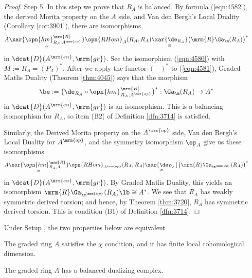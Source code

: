 \begin{proof}
\medskip \noindent Step 5.  
In this step we prove that $R_A$ is balanced. 
By formula (\ref{eqn:4582}), the derived Morita property on the $A$ side, and 
Van den Bergh's Local Duality (Corollary \ref{cor:3901}), there are isomorphisms
\begin{equation} \label{eqn:4581}
A \underset{\cong}{\xar{\opn{hm}^{\mrm{R}}_{R_A, A^{\mrm{op}}}}} 
\opn{RHom}_{A}(R_A, R_A) \underset{\cong}{\xar{\de_{R_A}}}
\bigl( \mrm{R} \Ga_{\m}(R_A) \bigr)^* 
\end{equation}
in $\dcat{D}(A^{\mrm{en}}, \mrm{gr})$.
See the isomorphism (\ref{eqn:4580}) with $M := R_A = (P_A)^*$.
After we apply the functor $(-)^*$ to (\ref{eqn:4581}), Graded Matlis Duality 
(Theorem \ref{thm:4045}) says that the morphism 
\[ \be := 
\bigl( \de_{R_A} \circ \opn{hm}^{\mrm{R}}_{R_A, A^{\mrm{op}}} \bigr)^* : 
\Ga_{\m}(R_A) \to A^* \]
in $\dcat{D}(A^{\mrm{en}}, \mrm{gr})$ is an isomorphism. This is a 
balancing isomorphism for $R_A$, so item (B2) of Definition 
\ref{dfn:3714} is satisfied.

Similarly, the Derived Morita property on the $A^{\mrm{op}}$ side, 
Van den Bergh's Local Duality for $A^{\mrm{op}}$, and the symmetry isomorphism 
$\ep_A$ give us these isomorphisms 
\[ A \underset{\cong}{\xar{\opn{hm}^{\mrm{R}}_{R_A, A}}} 
\opn{RHom}_{A^{\mrm{op}}}(R_A, R_A) \underset{\cong}{\xar{\de_{R_A}}}
\bigl( \mrm{R} \Ga_{\m^{\mrm{op}}}(R_A) \bigr)^* \]
in $\dcat{D}(A^{\mrm{en}}, \mrm{gr})$.
By Graded Matlis Duality, this yields an isomorphism 
$\mrm{R} \Ga_{\m^{\mrm{op}}}(R_A) \lb \cong A^*$. We see that 
$R_A$ has weakly symmetric derived torsion; and hence, by Theorem 
\ref{thm:3720}, $R_A$ has symmetric derived torsion. This is condition (B1) of 
Definition \ref{dfn:3714}.
\end{proof}

\begin{cor} \label{cor:4585} 
Under Setup \tup{\ref{setup:3925}}, the two properties below are 
equivalent\tup{:}
\begin{enumerate}
  The graded ring $A$ satisfies the $\chi$ condition, and it has 
finite local cohomological dimension. 

 The graded ring $A$ has a balanced dualizing complex.
\end{enumerate}
\end{cor}

